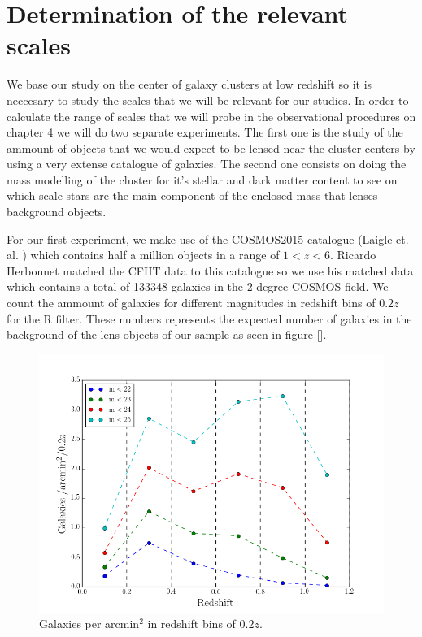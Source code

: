 \chapter{Determination of the relevant scales}

We base our study on the center of galaxy clusters at low redshift so it is neccesary to study the scales that we will be relevant for our studies. In order to calculate the range of scales that we will probe in the observational procedures on chapter 4 we will do two separate experiments. The first one is the study of the ammount of objects that we would expect to be lensed near the cluster centers by using a very extense catalogue of galaxies. The second one consists on doing the mass modelling of the cluster for it's stellar and dark matter content to see on which scale stars are the main component of the enclosed mass that lenses background objects.

For our first experiment, we make use of the COSMOS2015 catalogue (Laigle et. al. \citeyear{Reference21}) which contains half a million objects in a range of $1<z<6$. Ricardo Herbonnet matched the CFHT data to this catalogue so we use his matched data which contains a total of 133348 galaxies in the 2 degree COSMOS field. We count the ammount of galaxies for different magnitudes in redshift bins of $0.2z$ for the R filter. These numbers represents the expected number of galaxies in the background of the lens objects of our sample as seen in figure []. 

\begin{figure}[H]
\centering
\includegraphics[width=12cm]{images/galaxies_per_arcmin.png}
\caption[Galaxies per arcmin]{Galaxies per arcmin$^2$ in redshift bins of $0.2z$. }
\end{figure}

